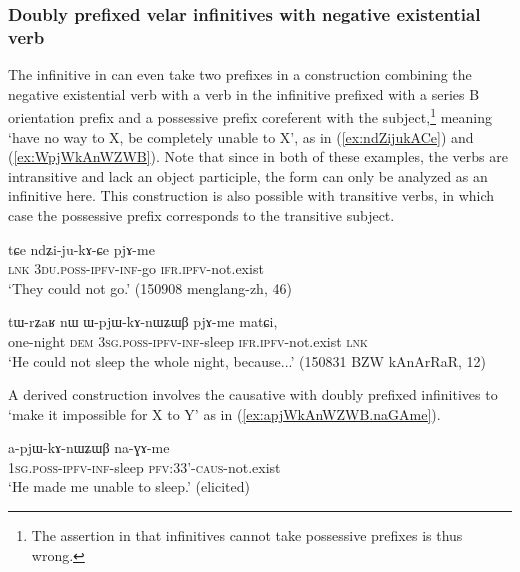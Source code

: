 \subsubsection{Doubly prefixed velar infinitives with negative existential verb} \label{sec:inf.exist}
The infinitive in  can even take two prefixes in a construction combining the negative existential verb  with a verb in the infinitive prefixed with a series B orientation prefix and a possessive prefix coreferent with the subject,\footnote{The assertion in \citet[228]{jacques16complementation} that infinitives cannot take possessive prefixes is thus wrong.} meaning `have no way to X, be completely unable to X', as in (\ref{ex:ndZijukACe}) and (\ref{ex:WpjWkAnWZWB}). Note that since in both of these examples, the verbs are intransitive and lack an object participle, the  form can only be analyzed as an infinitive here. This construction is also possible with transitive verbs, in which case the possessive prefix corresponds to the transitive subject.

\begin{exe}
\ex \label{ex:ndZijukACe}
\gll tɕe ndʑi-ju-kɤ-ɕe pjɤ-me \\
\textsc{lnk} \textsc{3du}.\textsc{poss}-\textsc{ipfv}-\textsc{inf}-go \textsc{ifr}.\textsc{ipfv}-not.exist \\
\glt `They could not go.' (150908 menglang-zh, 46)
\end{exe}

\begin{exe}
\ex \label{ex:WpjWkAnWZWB}
\gll tɯ-rʑaʁ nɯ ɯ-pjɯ-kɤ-nɯʑɯβ pjɤ-me matɕi, \\
one-night \textsc{dem} \textsc{3sg}.\textsc{poss}-\textsc{ipfv}-\textsc{inf}-sleep \textsc{ifr}.\textsc{ipfv}-not.exist \textsc{lnk} \\
\glt `He could not sleep the whole night, because...' (150831 BZW kAnArRaR, 12)
\end{exe}

A derived construction involves the causative  with doubly prefixed infinitives to `make it impossible for X to Y' as in (\ref{ex:apjWkAnWZWB.naGAme}).

\begin{exe}
\ex \label{ex:apjWkAnWZWB.naGAme}
\gll a-pjɯ-kɤ-nɯʑɯβ na-ɣɤ-me \\
\textsc{1sg}.\textsc{poss}-\textsc{ipfv}-\textsc{inf}-sleep \textsc{pfv}:3\fl{}3'-\textsc{caus}-not.exist \\
\glt `He made me unable to sleep.' (elicited)
\end{exe}

